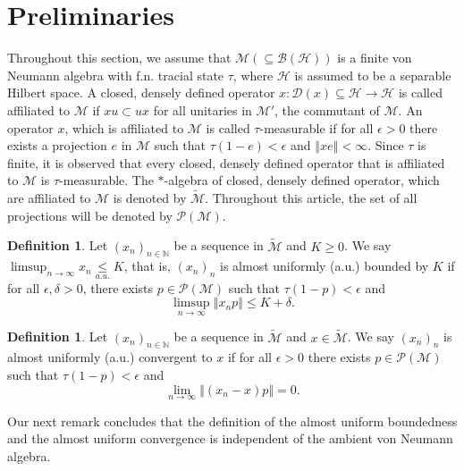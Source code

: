 \documentclass[10pt]{amsart}
\theoremstyle{definition}
\newtheorem{defn}[thm]{Definition}
\theoremstyle{myremark}
\numberwithin{equation}{section}
\def\N{\mathbb N}
\newcommand{\CB}{\mathcal{B}}
\newcommand{\CD}{\mathcal{D}}
\newcommand{\h}{\mathcal{H}}
\newcommand{\CM}{\mathcal{M}}
\newcommand{\CP}{\mathcal{P}}
\newcommand{\norm}[1]{\left\Vert#1\right\Vert}
\newcommand{\ri}{\rightarrow}
\newcommand{\limn}{ \underset{n \ri \infty}{\lim} }
\newcommand{\auleq}{\underset{a.u.}{\leq }}
\begin{document}
\section{Preliminaries}\label{sec: prelim}
Throughout this section, we assume that $\CM (\subseteq \CB(\h))$ is a finite von Neumann algebra with f.n. tracial state $\tau$, where $\h$ is assumed to be a separable Hilbert space. A closed, densely defined operator $x: \CD(x) \subseteq \h \to \h$ is called affiliated to $\CM$ if $xu \subset ux$ for all unitaries in $\CM'$, the commutant of $\CM$. An operator $x$, which is affiliated to $\CM$ is called $\tau$-measurable if for all $\epsilon>0$ there exists a projection $e$ in $\CM$ such that $\tau(1-e)< \epsilon$ and $\norm{xe}< \infty$. Since $\tau$ is finite, it is observed that every closed, densely defined operator that is affiliated to $\CM$ is $\tau$-measurable. The $*$-algebra of closed, densely defined operator, which are affiliated to $\CM$ is denoted by $\widetilde{\CM}$. Throughout this article, the set of all projections will be denoted by $\CP(\CM)$.

\begin{defn}\label{defn: auleq}
Let $(x_n)_{n \in \N}$ be a sequence in $\widetilde{\CM}$ and $K \geq 0$. We say $\limsup_{n \to \infty} x_n \auleq K$, that is,  $(x_n)_n$ is almost uniformly (a.u.) bounded by $K$ if for all $\epsilon, \delta>0$, there exists $p \in \CP(\CM)$ such that $\tau(1-p)< \epsilon$ and 
\[
\limsup_{n \to \infty} \norm{x_np} \leq K + \delta.
\]
\end{defn}

\begin{defn}\label{defn: auconv}
Let $(x_n)_{n \in \N}$ be a sequence in $\widetilde{\CM}$ and $x \in \widetilde{\CM}$. We say  $(x_n)_n$ is almost uniformly (a.u.) convergent to $x$ if for all $\epsilon>0$ there exists $p \in \CP(\CM)$ such that $\tau(1-p)< \epsilon$ and 
\[
\limn \norm{(x_n-x)p}=0.
\]
\end{defn}

Our next remark concludes that the definition of the almost uniform boundedness and the almost uniform convergence is independent of the ambient von Neumann algebra. 
\end{document}
